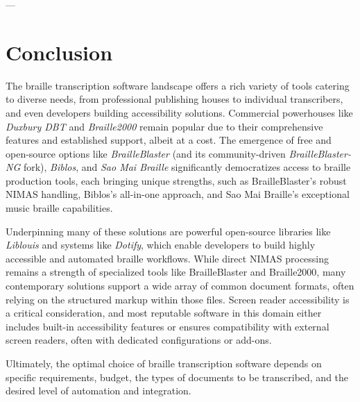 ---

\section{Conclusion}
\label{sec:braille-conclusion}
The braille transcription software landscape offers a rich variety of tools catering to diverse needs, from professional publishing houses to individual transcribers, and even developers building accessibility solutions. Commercial powerhouses like \emph{Duxbury DBT} and \emph{Braille2000} remain popular due to their comprehensive features and established support, albeit at a cost. The emergence of free and open-source options like \emph{BrailleBlaster} (and its community-driven \emph{BrailleBlaster-NG} fork), \emph{Biblos}, and \emph{Sao Mai Braille} significantly democratizes access to braille production tools, each bringing unique strengths, such as BrailleBlaster's robust NIMAS handling, Biblos's all-in-one approach, and Sao Mai Braille's exceptional music braille capabilities.

Underpinning many of these solutions are powerful open-source libraries like \emph{Liblouis} and systems like \emph{Dotify}, which enable developers to build highly accessible and automated braille workflows. While direct NIMAS processing remains a strength of specialized tools like BrailleBlaster and Braille2000, many contemporary solutions support a wide array of common document formats, often relying on the structured markup within those files. Screen reader accessibility is a critical consideration, and most reputable software in this domain either includes built-in accessibility features or ensures compatibility with external screen readers, often with dedicated configurations or add-ons.

Ultimately, the optimal choice of braille transcription software depends on specific requirements, budget, the types of documents to be transcribed, and the desired level of automation and integration.
